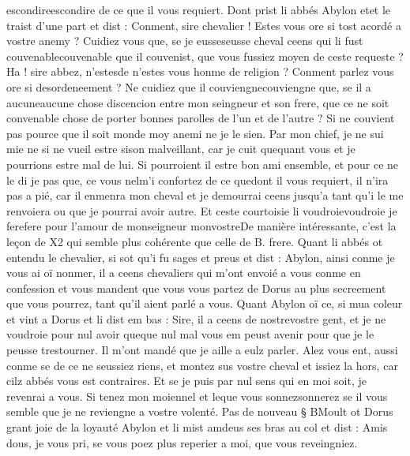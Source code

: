 \documentclass{article}
\begin{document}
\begin{pages}
      escondireescondire de ce que il vous requiert.
   Dont prist li abbés Abylon 
   etet le traist d'une part et dist :
   Conment, sire chevalier ! Estes vous ore si tost acordé a vostre anemy ? Cuidiez vous que, 
      se je eusseseusse cheval ceens qui li fust 
      couvenablecouvenable que il couvenist, 
      que vous fussiez moyen de ceste requeste ?Ha ! sire abbez, n'estesde n'estes vous honme 
      de religion ? Conment parlez vous ore si desordeneement ? Ne cuidiez que il 
      couviengnecouviengne que, se il a 
      aucuneaucune chose discencion entre 
      mon seingneur et son frere, que ce ne soit 
      convenable chose de porter bonnes parolles de l’un et de l’autre ? Si ne couvient pas pource que il soit 
      monde moy anemi ne je le sien. 
      Par mon chief, je ne sui mie ne si ne vueil estre sison malveillant, 
      car je cuit 
      quequant vous et je pourrions estre mal de lui. Si pourroient 
      il estre bon ami ensemble, et pour ce ne le di je pas que, 
      ce vous nelm'i confortez de ce 
      quedont il vous requiert, il n’ira pas a pié, car il enmenra mon cheval 
      et je demourrai ceens jusqu’a tant qu’i le me renvoiera ou que je pourrai avoir autre. Et ceste 
         courtoisie li voudroievoudroie je 
      ferefere pour l'amour de monseigneur 
         monvostreDe manière intéressante, c'est la leçon de X2 
         qui semble plus cohérente que celle de B. frere. \pend
\pstart Quant li abbés ot entendu le chevalier,
   si sot qu’i fu sages et preus et dist :
   Abylon, 
      ainsi conme je vous ai 
         oï nonmer, 
   il a ceens chevaliers qui m’ont envoié a vous conme en confession et vous mandent que vous vous partez de 
   Dorus au plus secreement que vous pourrez, tant qu’il aient parlé a vous.
   Quant Abylon oï ce, si mua coleur et vint a Dorus et li dist em bas :
   Sire, il a ceens de nostrevostre gent, 
      et je ne voudroie pour nul avoir queque nul 
   mal vous em peust avenir pour que je le peusse trestourner. Il m’ont mandé que je aille a eulz parler. Alez vous ent, 
   aussi conme se de ce ne seussiez riens, et montez sus vostre cheval et issiez la hors, 
   car cilz abbés vous est contraires. Et se je puis par nul sens qui en moi soit, je revenrai a vous. 
      Si tenez mon moiennel et leque vous 
      sonnezsonnerez se il vous semble que je ne reviengne a vostre volenté. \pend
\pstart Pas de nouveau § BMoult ot Dorus 
   grant joie de la loyauté Abylon et li mist amdeus ses bras au col et dist :
   Amis dous, je vous pri, se vous poez plus 
      reperier a moi, que vous reveingniez. 

\end{pages}
\end{document}
